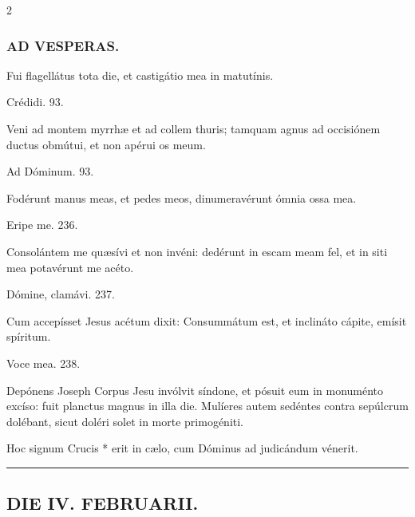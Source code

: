\documentclass[9pt,twoside]{extarticle}
\begin{document}
\begin{multicols}{2}
\subsubsection*{\center \textsc{AD VESPERAS.}}
\begin{tightlist}{}
\item {} Fui flagellátus tota die, et castigátio mea in matutínis.
\item {} Crédidi. 93.
\item {} Veni ad montem myrrhæ et ad collem thuris; tamquam agnus ad occisiónem ductus obmútui, et non apérui os meum.
\item {} Ad Dóminum. 93. 
\item {} Fodérunt manus meas, et pedes meos, dinumeravérunt ómnia ossa mea.
\item {} Eripe me. 236. 
\item {} Consolántem me quæsívi et non invéni: dedérunt in escam meam fel, et in siti mea potavérunt me acéto.
\item {} Dómine, clamávi. 237. 
\item {} Cum accepísset Jesus acétum dixit: Consummátum est, et inclináto cápite, emísit spíritum.
\item {} Voce mea. 238.
\item {}
\item {} Depónens Joseph Corpus Jesu invólvit síndone, et pósuit eum in monuménto excíso: fuit planctus magnus in illa die. Mulíeres autem sedéntes contra sepúlcrum dolébant, sicut doléri solet in morte primogéniti.
\item {}
\item {} Hoc signum Crucis * erit in cælo, cum Dóminus ad judicándum vénerit.
\end{tightlist}

\begin{center}\textcolor{red}{\rule{\linewidth}{0.5pt}} \end{center}

\subsection*{\center \textsc{DIE IV. FEBRUARII.}}
\subsubsection*{\center {}}

\end{multicols}
\end{document}
